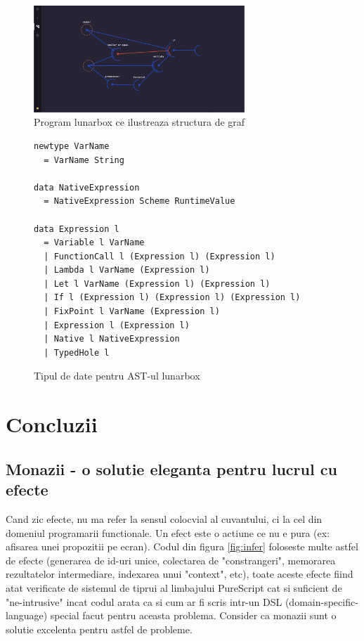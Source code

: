 \documentclass{article}
\begin{document}
\begin{figure}[H]
	\centering
	\includegraphics[width=300px]{graph.png}
	\caption{Program lunarbox ce ilustreaza structura de graf}
	\label{img:graph}
\end{figure}

\begin{figure}[H]
	\centering
	\begin{verbatim}
newtype VarName
  = VarName String

data NativeExpression
  = NativeExpression Scheme RuntimeValue

data Expression l
  = Variable l VarName
  | FunctionCall l (Expression l) (Expression l)
  | Lambda l VarName (Expression l)
  | Let l VarName (Expression l) (Expression l)
  | If l (Expression l) (Expression l) (Expression l)
  | FixPoint l VarName (Expression l)
  | Expression l (Expression l)
  | Native l NativeExpression
  | TypedHole l
\end{verbatim}
	\caption{Tipul de date pentru AST-ul lunarbox}
	\label{fig:expr}
\end{figure}


\section{Concluzii}
\subsection{Monazii - o solutie eleganta pentru lucrul cu efecte}
Cand zic efecte, nu ma refer la sensul colocvial al cuvantului, ci la cel din domeniul programarii functionale.
Un efect este o actiune ce nu e pura (ex: afisarea unei propozitii pe ecran).
Codul din figura \ref{fig:infer} foloseste multe astfel de efecte (generarea de id-uri unice, colectarea de "constrangeri", memorarea rezultatelor intermediare, indexarea unui "context", etc), toate aceste efecte fiind atat verificate de sistemul de tiprui al limbajului PureScript cat si suficient de "ne-intrusive" incat codul arata ca si cum ar fi scris intr-un DSL (domain-specific-language) special facut pentru aceasta problema.
Consider ca monazii sunt o solutie excelenta pentru astfel de probleme.
\end{document}
